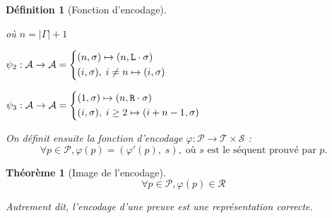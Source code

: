 \documentclass[11pt,a4paper]{article}
\newtheorem{definition}{Définition}
\newtheorem{theorem}{Théorème}
\newcommand*{\Left}{\textnormal{\texttt{L}}}
\newcommand*{\Right}{\textnormal{\texttt{R}}}
\newcommand*{\proofs}{\ensuremath{\mathcal{P}}}
\newcommand*{\sequents}{\ensuremath{\mathcal{S}}}
\newcommand*{\addresses}{\ensuremath{\mathcal{A}}}
\newcommand*{\trees}{\ensuremath{\mathcal{T}}}
\newcommand*{\representationslarge}{\ensuremath{\trees \times \sequents}}
\newcommand*{\representations}{\ensuremath{\mathcal{R}}}
\newcommand*{\encode}{\ensuremath{\varphi}}
\begin{document}
\begin{definition}[Fonction d'encodage]
\begin{itemize}
{    où $n = | \Gamma | + 1$
    
    $\psi_2 : \addresses \rightarrow \addresses =
    \begin{cases*}
        (n, \sigma) \mapsto (n, \Left \cdot \sigma)\\
        (i, \sigma), \; i \neq n \mapsto (i, \sigma)
    \end{cases*}$
    
    $\psi_3 : \addresses \rightarrow \addresses =
    \begin{cases*}
        (1, \sigma) \mapsto (n, \Right \cdot \sigma)\\
        (i, \sigma), \; i \geq 2 \mapsto (i + n - 1, \sigma)
    \end{cases*}$}
    \end{itemize}

    On définit ensuite la fonction d'encodage $\encode : \proofs \rightarrow \representationslarge$ :
    \begin{equation*}
    \forall p \in \proofs, \encode \left( p \right) = \left( \encode' \left( p \right), \; s \right), \; \text{où $s$ est le séquent prouvé par $p$.}
    \end{equation*}
\end{definition}

\begin{theorem}[Image de l'encodage]
    \begin{equation*}
    \forall p \in \proofs, \encode \left( p \right) \in \representations
    \end{equation*}

    Autrement dit, l'encodage d'une preuve est une représentation correcte.
\end{theorem}
\end{document}
